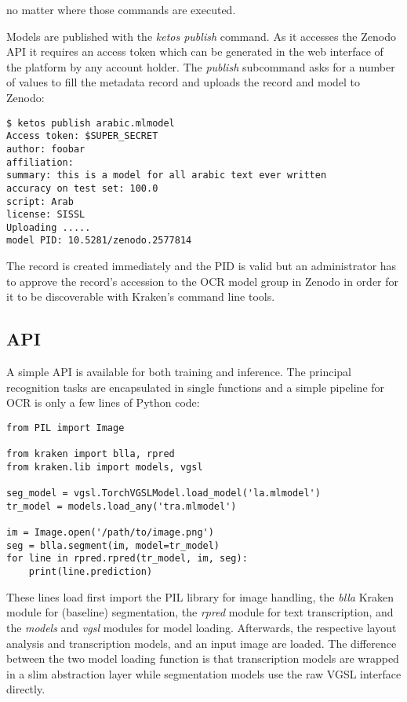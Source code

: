 no matter where those commands are executed.

Models are published with the \emph{ketos publish} command. As it accesses the
Zenodo API it requires an access token which can be generated in the web
interface of the platform by any account holder. The \emph{publish} subcommand
asks for a number of values to fill the metadata record and uploads the record
and model to Zenodo:

\begin{verbatim}
$ ketos publish arabic.mlmodel
Access token: $SUPER_SECRET
author: foobar
affiliation:
summary: this is a model for all arabic text ever written
accuracy on test set: 100.0
script: Arab
license: SISSL
Uploading .....
model PID: 10.5281/zenodo.2577814
\end{verbatim}

The record is created immediately and the PID is valid but an administrator has
to approve the record's accession to the OCR model group in Zenodo in order for
it to be discoverable with Kraken's command line tools.

\subsection{API}

A simple API is available for both training and inference. The principal
recognition tasks are encapsulated in single functions and a simple pipeline
for OCR is only a few lines of Python code:

\begin{verbatim}
from PIL import Image

from kraken import blla, rpred
from kraken.lib import models, vgsl

seg_model = vgsl.TorchVGSLModel.load_model('la.mlmodel')
tr_model = models.load_any('tra.mlmodel')

im = Image.open('/path/to/image.png')
seg = blla.segment(im, model=tr_model)
for line in rpred.rpred(tr_model, im, seg):
    print(line.prediction)
\end{verbatim}

These lines load first import the PIL library for image handling, the
\emph{blla} Kraken module for (baseline) segmentation, the \emph{rpred} module
for text transcription, and the \emph{models} and \emph{vgsl} modules for model
loading. Afterwards, the respective layout analysis and transcription models,
and an input image are loaded. The difference between the two model loading
function is that transcription models are wrapped in a slim abstraction layer
while segmentation models use the raw VGSL interface directly.


